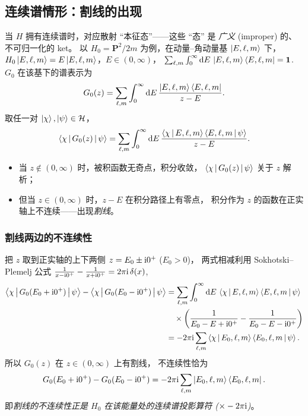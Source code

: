 \subsection{连续谱情形：割线的出现}

当 $H$ 拥有连续谱时，对应散射 ``本征态''——这些 ``态'' 是
\emph{广义} (improper) 的、不可归一化的 ket。
以 $H_0=\bm P^2/2m$ 为例，在动量–角动量基 $\ket{E,\ell,m}$ 下，
$H_0\ket{E,\ell,m}=E\ket{E,\ell,m}$，$E\in(0,\infty)$，
$\sum_{\ell,m}\int_0^\infty\mathrm{d} E\,\ket{E,\ell,m}\bra{E,\ell,m}=\mathbf 1$.
$G_0$ 在该基下的谱表示为
\begin{equation}\label{eq:G0-spectral}
  G_0(z) = \sum_{\ell,m}\int_0^\infty \mathrm{d} E\,
           \frac{\ket{E,\ell,m}\bra{E,\ell,m}}{z-E}.
\end{equation}
取任一对 $\ket{\chi},\ket{\psi}\in\mathcal{H}$，
\begin{equation}
  \left\langle \chi \,\middle|\, G_0(z) \,\middle|\, \psi \right\rangle
  = \sum_{\ell,m}\int_0^\infty \mathrm{d} E\,
    \frac{\left\langle \chi \,\middle|\, E,\ell,m \right\rangle\left\langle E,\ell,m \,\middle|\, \psi \right\rangle}{z-E}.
\end{equation}
\begin{itemize}
  \item 当 $z\notin (0,\infty)$ 时，被积函数无奇点，积分收敛，
        $\left\langle \chi \,\middle|\, G_0(z) \,\middle|\, \psi \right\rangle$ 关于 $z$ 解析；
  \item 但当 $z\in(0,\infty)$ 时，$z-E$ 在积分路径上有零点，
        积分作为 $z$ 的函数在正实轴上不连续——出现\emph{割线}。
\end{itemize}

\subsubsection*{割线两边的不连续性}

把 $z$ 取到正实轴的上下两侧 $z=E_0\pm\mathrm{i} 0^+$ ($E_0>0$)，
两式相减利用 Sokhotski--Plemelj 公式
$\frac{1}{x-\mathrm{i} 0^+}-\frac{1}{x+\mathrm{i} 0^+}=2\pi\mathrm{i}\,\delta(x)$,
\begin{align}
  \left\langle \chi \,\middle|\, G_0(E_0+\mathrm{i} 0^+) \,\middle|\, \psi \right\rangle
  -\left\langle \chi \,\middle|\, G_0(E_0-\mathrm{i} 0^+) \,\middle|\, \psi \right\rangle
  &= \sum_{\ell,m}\int_0^\infty \mathrm{d} E\,
     \left\langle \chi \,\middle|\, E,\ell,m \right\rangle\left\langle E,\ell,m \,\middle|\, \psi \right\rangle\notag\\
  &\quad\times\left(\frac{1}{E_0-E+\mathrm{i} 0^+}-\frac{1}{E_0-E-\mathrm{i} 0^+}\right)\notag\\
  &= -2\pi\mathrm{i}\sum_{\ell,m}\left\langle \chi \,\middle|\, E_0,\ell,m \right\rangle\left\langle E_0,\ell,m \,\middle|\, \psi \right\rangle.
\end{align}
所以 $G_0(z)$ 在 $z\in(0,\infty)$ 上有割线，
不连续性恰为
\begin{equation}\label{eq:G0-discontinuity}
  G_0(E_0+\mathrm{i} 0^+) - G_0(E_0-\mathrm{i} 0^+)
  = -2\pi\mathrm{i}\sum_{\ell,m}\ket{E_0,\ell,m}\bra{E_0,\ell,m}.
\end{equation}
即\emph{割线的不连续性正是 $H_0$ 在该能量处的连续谱投影算符 ($\times -2\pi\mathrm{i}$)}。

